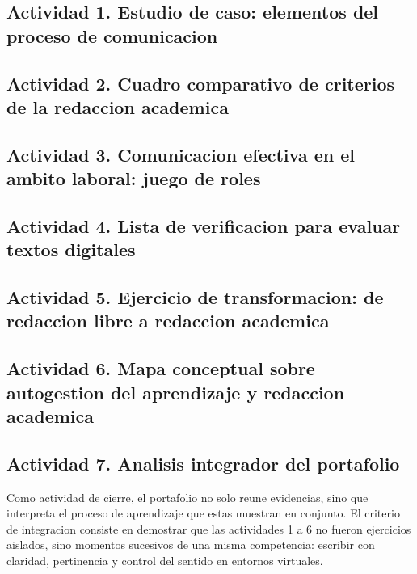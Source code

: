 \documentclass[
	spanish,
	letterpaper, oneside
]{article}
\begin{document}
\subsection{Actividad 1. Estudio de caso: elementos del proceso de comunicacion}


\clearpage
\subsection{Actividad 2. Cuadro comparativo de criterios de la redaccion academica}


\clearpage
\subsection{Actividad 3. Comunicacion efectiva en el ambito laboral: juego de roles}


\clearpage
\subsection{Actividad 4. Lista de verificacion para evaluar textos digitales}


\clearpage
\subsection{Actividad 5. Ejercicio de transformacion: de redaccion libre a redaccion academica}


\clearpage
\subsection{Actividad 6. Mapa conceptual sobre autogestion del aprendizaje y redaccion academica}


\clearpage
\subsection{Actividad 7. Analisis integrador del portafolio}

Como actividad de cierre, el portafolio no solo reune evidencias, sino que interpreta el proceso de aprendizaje que estas muestran en conjunto. El criterio de integracion consiste en demostrar que las actividades 1 a 6 no fueron ejercicios aislados, sino momentos sucesivos de una misma competencia: escribir con claridad, pertinencia y control del sentido en entornos virtuales.
\end{document}
